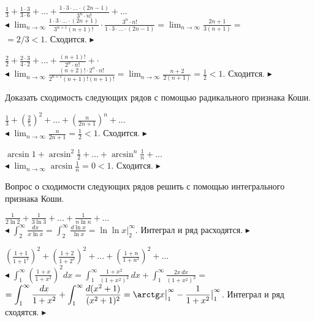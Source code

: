 \documentclass[a5paper,10pt]{article}
\begin{document}
\medskip
{} $\displaystyle\frac{1}{3}+\frac{1\cdot 3}{3\cdot 6}+
\ldots+\frac{1\cdot3\cdot\ldots\cdot(2n-1)}{3^n\cdot n!}+\ldots$\\
$\blacktriangleleft$ $\displaystyle\lim_{n\to\infty}
\frac{1\cdot3\cdot\ldots\cdot(2n+1)}{3^{n+1}(n+1)!}\cdot
\frac{3^n\cdot n!}{1\cdot3\cdot\ldots\cdot(2n-1)}=
\lim_{n\to\infty}\frac{2n+1}{3(n+1)}=$\\
$\displaystyle =2/3<1$. Сходится. $\blacktriangleright$

\medskip
{} $\displaystyle\frac22+\frac{2\cdot3}{4\cdot 2}+\ldots+
\frac{(n+1)!}{2^n\cdot n!}+\cdot$\\
$\blacktriangleleft$ $\displaystyle\lim_{n\to\infty}\frac{(n+2)!\cdot2^n\cdot n!}
{2^{n+1}(n+1)!(n+1)!}=\lim_{n\to\infty}\frac{n+2}{2(n+1)}=\frac12<1$. Сходится.
$\blacktriangleright$

\medskip
\noindent Доказать сходимость следующих рядов с помощью радикального признака Коши.

\medskip
{} $\displaystyle\frac13+\left(\frac25\right)^2+\dots
+\left(\frac{n}{2n+1}\right)^n+\ldots$\\
$\blacktriangleleft$ $\displaystyle\lim_{n\to\infty}\frac{n}{2n+1}=\frac12<1$.
Сходится. $\blacktriangleright$

\medskip
{} $\displaystyle\arcsin 1+\arcsin^2\frac12+\ldots+
\arcsin^n\frac1n+\dots$\\
$\blacktriangleleft$ $\displaystyle\lim_{n\to\infty}\arcsin\frac1n=0<1$. Сходится.
$\blacktriangleright$

\medskip
\noindent Вопрос о сходимости следующих рядов решить с помощью интегрального
признака Коши.

\medskip
{} $\displaystyle\frac{1}{2\ln2}+\frac{1}{3\ln3}+\ldots+
\frac{1}{n\ln n}+\ldots$\\

\smallskip
\noindent$\blacktriangleleft$ $\displaystyle\int_2^\infty\frac{dx}{x\ln x}=
\int_2^\infty\frac{d\ln x}{\ln x}=\ln\ln x\big|_2^\infty$. Интеграл и ряд расходятся.
$\blacktriangleright$

\medskip
{} $\displaystyle\left(\frac{1+1}{1+1^2}\right)^2+
\left(\frac{1+2}{1+2^2}\right)^2+\ldots+\left(\frac{1+n}{1+n^2}\right)^2+
\ldots$\\
$\blacktriangleleft$ $\displaystyle\int_1^\infty\left(\frac{1+x}{1+x^2}\right)^2dx=
\int_1^\infty\frac{1+x^2}{(1+x^2)^2}\,dx+\int_1^\infty\frac{2x\,dx}{(1+x^2)^2}=$\\
$\displaystyle =
\int_1^\infty\frac{dx}{1+x^2}+\int_1^\infty\frac{d(x^2+1)}{(x^2+1)^2}=
\arctg x\big|_1^\infty-\frac{1}{1+x^2}\big|_1^\infty$. Интеграл и ряд сходятся.
$\blacktriangleright$
\end{document}
